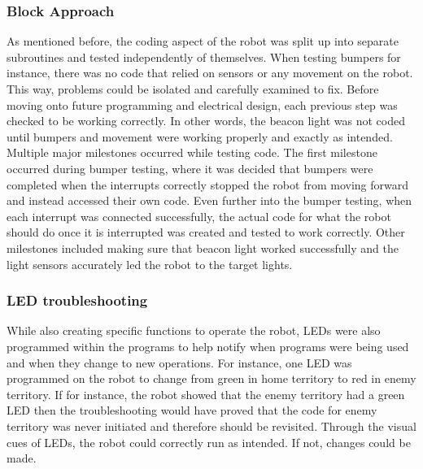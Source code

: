 \documentclass{article}
\begin{document}
    \subsubsection{Block Approach}
    As mentioned before, the coding aspect of the robot was split up into separate subroutines and tested independently of themselves. When testing bumpers for instance, there was no code that relied on sensors or any movement on the robot. This way, problems could be isolated and carefully examined to fix. Before moving onto future programming and electrical design, each previous step was checked to be working correctly. In other words, the beacon light was not coded until bumpers and movement were working properly and exactly as intended. \\
    
    Multiple major milestones occurred while testing code. The first milestone occurred during bumper testing, where it was decided that bumpers were completed when the interrupts correctly stopped the robot from moving forward and instead accessed their own code. Even further into the bumper testing, when each interrupt was connected successfully, the actual code for what the robot should do once it is interrupted was created and tested to work correctly. Other milestones included making sure that beacon light worked successfully and the light sensors accurately led the robot to the target lights.
    
    \subsubsection{LED troubleshooting}
    While also creating specific functions to operate the robot, LEDs were also programmed within the programs to help notify when programs were being used and when they change to new operations. For instance, one LED was programmed on the robot to change from green in home territory to red in enemy territory. If for instance, the robot showed that the enemy territory had a green LED then the troubleshooting would have proved that the code for enemy territory was never initiated and therefore should be revisited. Through the visual cues of LEDs, the robot could correctly run as intended. If not, changes could be made.
    
\end{document}
